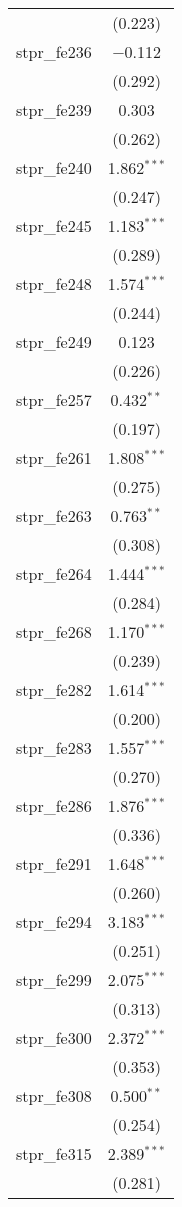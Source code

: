\begin{table}[!htbp]
\begin{tabular}{@{\extracolsep{5pt}}lc}
  & (0.223) \\ 
  stpr\_fe236 & $-$0.112 \\ 
  & (0.292) \\ 
  stpr\_fe239 & 0.303 \\ 
  & (0.262) \\ 
  stpr\_fe240 & 1.862$^{***}$ \\ 
  & (0.247) \\ 
  stpr\_fe245 & 1.183$^{***}$ \\ 
  & (0.289) \\ 
  stpr\_fe248 & 1.574$^{***}$ \\ 
  & (0.244) \\ 
  stpr\_fe249 & 0.123 \\ 
  & (0.226) \\ 
  stpr\_fe257 & 0.432$^{**}$ \\ 
  & (0.197) \\ 
  stpr\_fe261 & 1.808$^{***}$ \\ 
  & (0.275) \\ 
  stpr\_fe263 & 0.763$^{**}$ \\ 
  & (0.308) \\ 
  stpr\_fe264 & 1.444$^{***}$ \\ 
  & (0.284) \\ 
  stpr\_fe268 & 1.170$^{***}$ \\ 
  & (0.239) \\ 
  stpr\_fe282 & 1.614$^{***}$ \\ 
  & (0.200) \\ 
  stpr\_fe283 & 1.557$^{***}$ \\ 
  & (0.270) \\ 
  stpr\_fe286 & 1.876$^{***}$ \\ 
  & (0.336) \\ 
  stpr\_fe291 & 1.648$^{***}$ \\ 
  & (0.260) \\ 
  stpr\_fe294 & 3.183$^{***}$ \\ 
  & (0.251) \\ 
  stpr\_fe299 & 2.075$^{***}$ \\ 
  & (0.313) \\ 
  stpr\_fe300 & 2.372$^{***}$ \\ 
  & (0.353) \\ 
  stpr\_fe308 & 0.500$^{**}$ \\ 
  & (0.254) \\ 
  stpr\_fe315 & 2.389$^{***}$ \\ 
  & (0.281) \\ 

\end{tabular}
\end{table}
